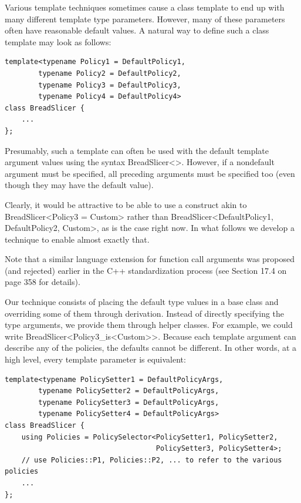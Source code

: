Various template techniques sometimes cause a class template to end up with many different template type parameters. However, many of these parameters often have reasonable default values. A natural way to define such a class template may look as follows:

\begin{lstlisting}[style=styleCXX]
template<typename Policy1 = DefaultPolicy1,
		typename Policy2 = DefaultPolicy2,
		typename Policy3 = DefaultPolicy3,
		typename Policy4 = DefaultPolicy4>
class BreadSlicer {
	...
};
\end{lstlisting}

Presumably, such a template can often be used with the default template argument values using the syntax BreadSlicer<>. However, if a nondefault argument must be specified, all preceding arguments must be specified too (even though they may have the default value).

Clearly, it would be attractive to be able to use a construct akin to BreadSlicer<Policy3 = Custom> rather than BreadSlicer<DefaultPolicy1, DefaultPolicy2, Custom>, as is the case right now. In what follows we develop a technique to enable almost exactly that.

\begin{tcolorbox}[colback=webgreen!5!white,colframe=webgreen!75!black]
\hspace*{0.75cm}Note that a similar language extension for function call arguments was proposed (and rejected) earlier in the C++ standardization process (see Section 17.4 on page 358 for details).
\end{tcolorbox}

Our technique consists of placing the default type values in a base class and overriding some of them through derivation. Instead of directly specifying the type arguments, we provide them through helper classes. For example, we could write BreadSlicer<Policy3\_is<Custom>>. Because each template argument can describe any of the policies, the defaults cannot be different. In other words, at a high level, every template parameter is equivalent:

\begin{lstlisting}[style=styleCXX]
template<typename PolicySetter1 = DefaultPolicyArgs,
		typename PolicySetter2 = DefaultPolicyArgs,
		typename PolicySetter3 = DefaultPolicyArgs,
		typename PolicySetter4 = DefaultPolicyArgs>
class BreadSlicer {
	using Policies = PolicySelector<PolicySetter1, PolicySetter2,
									PolicySetter3, PolicySetter4>;
	// use Policies::P1, Policies::P2, ... to refer to the various policies
	...
};
\end{lstlisting}

